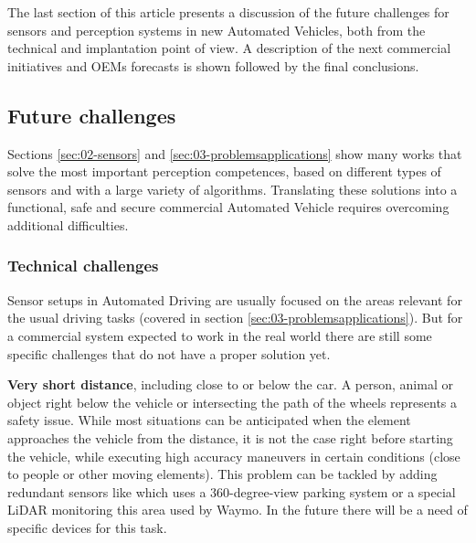 
The last section of this article presents a discussion of the future challenges 
for sensors and perception systems in new Automated Vehicles, both from the 
technical and implantation point of view. A description of the next 
commercial initiatives and OEMs forecasts is shown followed by the final 
conclusions.

\subsection{Future challenges}

Sections \ref{sec:02-sensors} and \ref{sec:03-problemsapplications} show many 
works that solve the most important perception competences, based on different 
types of sensors and with a large variety of algorithms. 
Translating these solutions into a functional, safe and secure commercial 
Automated Vehicle requires overcoming additional difficulties.

\subsubsection{Technical challenges}

Sensor setups in Automated Driving are usually focused on the areas relevant 
for the usual driving tasks (covered in section 
\ref{sec:03-problemsapplications}). 
But for a commercial system expected to work in the real world there are still
some specific challenges that do not have a proper solution yet.

\textbf{Very short distance}, including close to or below the car.
    A person, animal or object right below the vehicle or intersecting 
    the path of the wheels represents a safety issue. While most situations
    can be anticipated when the element approaches the vehicle from the
    distance, it is not the case right before starting the vehicle, 
    while executing high accuracy maneuvers in certain conditions 
    (close to people or other moving elements).  
    This problem can be tackled by adding redundant sensors like \cite{gandhi2006vehicle}
    which uses a 360-degree-view parking system or a special LiDAR monitoring this area
    used by Waymo.    
    In the future there will be a need of specific devices for this task.
      
